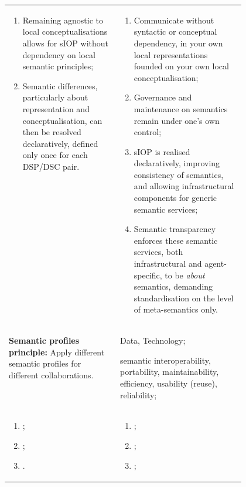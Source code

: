 \begin{xltabular}[l]{\linewidth}{@{} >{\small\raggedright\arraybackslash}p{0.47\linewidth} >{\small\raggedright\arraybackslash}X @{}}
\begin{enumerate}[left=6pt, nosep]
  \item Remaining agnostic to local conceptualisations allows for sIOP without dependency on local semantic principles;
  \item Semantic differences, particularly about representation and conceptualisation, can then be resolved declaratively, defined only once for each DSP/DSC pair.
\end{enumerate}
&
\begin{enumerate}[left=10pt, nosep]
  \item Communicate without syntactic or conceptual dependency, in your own local representations founded on your own local conceptualisation;
  \item Governance and maintenance on semantics remain under one's own control;
  \item sIOP is realised declaratively, improving consistency of semantics, and allowing infrastructural components for generic semantic services;
  \item Semantic transparency enforces these semantic services, both infrastructural and agent-specific, to be \emph{about} semantics, demanding standardisation on the level of meta-semantics only.
\end{enumerate} \\
%
%
%
\begin{mmdp}\label{dp:sprof}{\bfseries Semantic profiles principle:}
\quad Apply different semantic profiles for different collaborations. \end{mmdp}
&
\begin{description}[labelwidth=3.7cm,leftmargin=3.7cm+1ex,nosep,topsep=2ex,labelsep=1ex,font=\bfseries]
\item[Type of information:] Data, Technology;
\item[Quality attributes:] semantic interoperability, portability, maintainability, efficiency, usability (reuse), reliability;
\end{description}
\\
\begin{enumerate}[left=6pt, nosep]
  \item ;
  \item ;
  \item .
\end{enumerate}
&
\begin{enumerate}[left=10pt, nosep]
  \item ;
  \item ;
  \item ;

\end{enumerate}
\end{xltabular}
